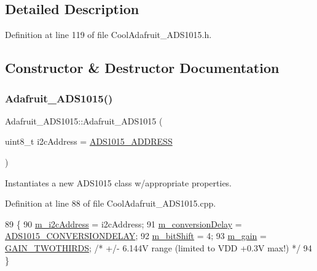 \subsection{Detailed Description}


Definition at line 119 of file Cool\+Adafruit\+\_\+\+A\+D\+S1015.\+h.



\subsection{Constructor \& Destructor Documentation}
\mbox{\label{class_adafruit___a_d_s1015_a12dfb7b48af1a8e411c59f775c6457ab}} 
\subsubsection{\texorpdfstring{Adafruit\+\_\+\+A\+D\+S1015()}{Adafruit\_ADS1015()}}
{\footnotesize\ttfamily Adafruit\+\_\+\+A\+D\+S1015\+::\+Adafruit\+\_\+\+A\+D\+S1015 (\begin{DoxyParamCaption}\item[{uint8\+\_\+t}]{i2c\+Address = {\ttfamily \hyperlink{_cool_adafruit___a_d_s1015_8h_ae55d158023984e8f0ddc80b58d5b30dc}{A\+D\+S1015\+\_\+\+A\+D\+D\+R\+E\+SS}} }\end{DoxyParamCaption})}



Instantiates a new A\+D\+S1015 class w/appropriate properties. 



Definition at line 88 of file Cool\+Adafruit\+\_\+\+A\+D\+S1015.\+cpp.


\begin{DoxyCode}
89 \{
90    \hyperlink{class_adafruit___a_d_s1015_a2186993621a7973256d47f086c74035d}{m\_i2cAddress} = i2cAddress;
91    \hyperlink{class_adafruit___a_d_s1015_aa3a29a64a6705fce1fee21d73c642a0e}{m\_conversionDelay} = \hyperlink{_cool_adafruit___a_d_s1015_8h_ad8139ae1a3f6d6e2f1873a6fd637e27c}{ADS1015\_CONVERSIONDELAY};
92    \hyperlink{class_adafruit___a_d_s1015_ab238ce17112a78db2be4ea14d57fb114}{m\_bitShift} = 4;
93    \hyperlink{class_adafruit___a_d_s1015_a8db90fe03d55a18246984ba2ba5e7f32}{m\_gain} = \hyperlink{_cool_adafruit___a_d_s1015_8h_a3d6c0e15829a207b9155890811fa4781a879d688347ec0bf159fe1278db602f68}{GAIN\_TWOTHIRDS}; \textcolor{comment}{/* +/- 6.144V range (limited to VDD +0.3V max!) */}
94 \}
\end{DoxyCode}


